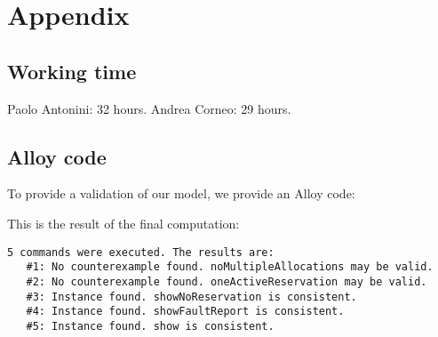 \chapter{Appendix}

\section{Working time}

Paolo Antonini: 32 hours.
Andrea Corneo: 29 hours.

\section{Alloy code}

To provide a validation of our model, we provide an Alloy code:



This is the result of the final computation:

\begin{verbatim}
5 commands were executed. The results are:
   #1: No counterexample found. noMultipleAllocations may be valid.
   #2: No counterexample found. oneActiveReservation may be valid.
   #3: Instance found. showNoReservation is consistent.
   #4: Instance found. showFaultReport is consistent.
   #5: Instance found. show is consistent.
\end{verbatim} 